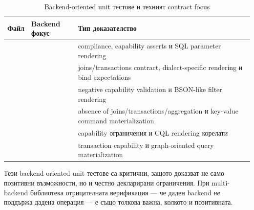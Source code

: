 \begin{table}[H]
\centering
\small
\caption{Backend-oriented unit тестове и техният contract focus}
\label{tab:verification_unit_connectors}
\begin{tabularx}{\textwidth}{L{3.4cm}L{3.1cm}Z}
\toprule
\textbf{Файл} & \textbf{Backend фокус} & \textbf{Тип доказателство} \\
\midrule
{} &  &  compliance, capability asserts и SQL parameter rendering \\
 &  & joins/transactions contract, dialect-specific rendering и bind expectations \\
 &  & negative capability validation и BSON-like filter rendering \\
 &  & absence of joins/transactions/aggregation и key-value command materialization \\
 &  & capability ограничения и CQL rendering корелати \\
 &  & transaction capability и graph-oriented query materialization \\
\bottomrule
\end{tabularx}
\end{table}

Тези backend-oriented unit тестове са критични, защото доказват не само позитивни възможности, но и честно декларирани ограничения. При multi-backend библиотека отрицателната верификация --- че даден backend \emph{не} поддържа дадена операция --- е също толкова важна, колкото и позитивната.

